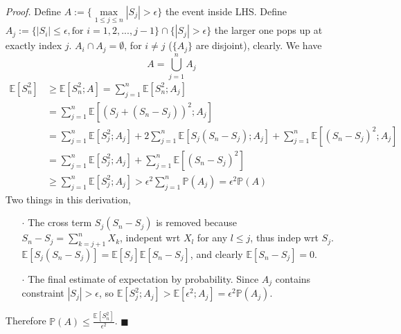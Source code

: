 \documentclass[a4paper,12pt,twoside]{book}
\begin{document}
\begin{itemize}
	\item[\textit{Proof.}] Define $A:=\{\max\limits_{1\leq j\leq n}|S_j|>\epsilon\}$ the event inside LHS. \newline
	Define $A_j := \{|S_i|\leq \epsilon, \text{for }i =1,2,...,j-1\}\cap\{|S_j|>\epsilon\}$ the larger one pops up at exactly index $j$.\newline
	$A_i \cap A_j=\emptyset$, for $i\ne j$ ($\{A_j\}$ are disjoint), clearly. \newline
	We have
	\begin{equation}
		A=\bigcup_{j=1}^{n}A_j
	\end{equation}
	\begin{equation}
		\begin{split}
			\mathbb{E}\left[S_n^2\right]&\geq \mathbb{E}\left[S_n^2; A\right]= \sum_{j=1}^n \mathbb{E}\left[S_n^2;A_j\right]\\
			&= \sum_{j=1}^n \mathbb{E}\left[(S_j+(S_n-S_j))^2; A_j\right]\\
			&= \sum_{j=1}^n \mathbb{E}\left[S_j^2; A_j\right]+2\sum_{j=1}^n \mathbb{E}\left[S_j(S_n-S_j);A_j\right]+\sum_{j=1}^n \mathbb{E}\left[(S_n-S_j)^2; A_j\right]\\
			&= \sum_{j=1}^n \mathbb{E}\left[S_j^2; A_j\right]+\sum_{j=1}^n \mathbb{E}\left[(S_n-S_j)^2\right]\\
			&\geq \sum_{j=1}^n \mathbb{E}\left[S_j^2; A_j\right]> \epsilon^2 \sum_{j=1}^n \mathbb{P}\left(A_j\right)=\epsilon^2 \mathbb{P}\left(A\right)
		\end{split}
	\end{equation}
	Two things in this derivation, \newline
	\begin{itemize}
		\item[$\cdot$] The cross term $S_j(S_n-S_j)$ is removed because $S_n-S_j=\sum_{k=j+1}^n X_k$, indepent wrt $X_l$ for any $l\leq j$, thus indep wrt $S_j$. $\mathbb{E}\left[S_j(S_n-S_j)\right]=\mathbb{E}\left[S_j\right]\mathbb{E}\left[S_n-S_j\right]$, and clearly $\mathbb{E}\left[S_n-S_j\right]=0$.
		\item[$\cdot$] The final estimate of expectation by probability. Since $A_j$ contains constraint $|S_j|>\epsilon$, so $\mathbb{E}\left[S^2_j; A_j\right]>\mathbb{E}\left[\epsilon^2; A_j\right]=\epsilon^2 \mathbb{P}\left(A_j\right)$.
	\end{itemize}
	Therefore $\mathbb{P}\left(A\right)\leq \frac{\mathbb{E}\left[S_n^2\right]}{\epsilon^2}$. $\blacksquare$
\end{itemize}
\end{document}
